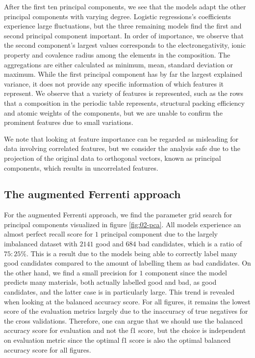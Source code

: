 After the first ten principal components, we see that the models adapt the other principal components with varying degree. Logistic regressions's coefficients experience large fluctuations, but the three remaining models find the first and second principal component important. In order of importance, we observe that the second component's largest values corresponds to the electronegativity, ionic property and covalence radius among the elements in the composition. The aggregations are either calculated as minimum, mean, standard deviation or maximum. While the first principal component has by far the largest explained variance, it does not provide any specific information of which features it represent. We observe that a variety of features is represented, such as the rows that a composition in the periodic table represents, structural packing efficiency and atomic weights of the components, but we are unable to confirm the prominent features due to small variations.

We note that looking at feature importance can be regarded as misleading for data involving correlated features, but we consider the analysis safe due to the projection of the original data to orthogonal vectors, known as principal components, which results in uncorrelated features.

\clearpage

\subsection{The augmented Ferrenti approach}

For the augmented Ferrenti approach, we find the parameter grid search for principal components visualized in figure \ref{fig:02-pca}. All models experience an almost perfect recall score for $1$ principal component due to the largely imbalanced dataset with $2141$ good and $684$ bad candidates, which is a ratio of $75:25 \%$. This is a result due to the models being able to correctly label many good candidates compared to the amount of labelling them as bad candidates. On the other hand, we find a small precision for $1$ component since the model predicts many materials, both actually labelled good and bad, as good candidates, and the latter case is in particularly large. This trend is revealed when looking at the balanced accuracy score. For all figures, it remains the lowest score of the evaluation metrics largely due to the inaccuracy of true negatives for the cross validations. Therefore, one can argue that we should use the balanced accuracy score for evaluation and not the f1 score, but the choice is independent on evaluation metric since the optimal f1 score is also the optimal balanced accuracy score for all figures.

